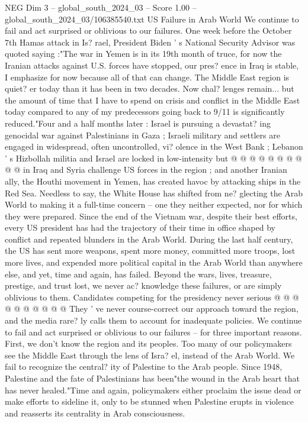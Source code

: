 \begin{textsample}{NEG Dim 3 – global\_south\_2024\_03 – Score 1.00 – global\_south\_2024\_03/106385540.txt}  \label{ex:f3_neg_039}
US Failure in Arab World We continue to fail and act surprised or oblivious to our failures.
One week before the October 7th Hamas attack in Is? rael, President Biden ' s National Security Advisor was quoted saying :"The war in Yemen is in its 19th month of truce, for now the Iranian attacks against U.S. forces have stopped, our pres? ence in Iraq is stable, I emphasize for now because all of that can change.
The Middle East region is quiet? er today than it has been in two decades.
Now chal? lenges remain... but the amount of time that I have to spend on crisis and conflict in the Middle East today compared to any of my predecessors going back to 9/11 is significantly reduced."Four and a half months later : Israel is pursuing a devastat? ing genocidal war against Palestinians in Gaza ; Israeli military and settlers are engaged in widespread, often uncontrolled, vi? olence in the West Bank ; Lebanon ' s Hizbollah militia and Israel are locked in low-intensity but @ @ @ @ @ @ @ @ @ @ in Iraq and Syria challenge US forces in the region ; and another Iranian ally, the Houthi movement in Yemen, has created havoc by attacking ships in the Red Sea.
Needless to say, the White House has shifted from ne? glecting the Arab World to making it a full-time concern -- one they neither expected, nor for which they were prepared.
Since the end of the Vietnam war, despite their best efforts, every US president has had the trajectory of their time in office shaped by conflict and repeated blunders in the Arab World.
During the last half century, the US has sent more weapons, spent more money, committed more troops, lost more lives, and expended more political capital in the Arab World than anywhere else, and yet, time and again, has failed.
Beyond the wars, lives, treasure, prestige, and trust lost, we never ac? knowledge these failures, or are simply oblivious to them.
Candidates competing for the presidency never serious @ @ @ @ @ @ @ @ @ @ They ' ve never course-correct our approach toward the region, and the media rare? ly calls them to account for inadequate policies.
We continue to fail and act surprised or oblivious to our failures -- for three important reasons.
First, we don't know the region and its peoples.
Too many of our policymakers see the Middle East through the lens of Isra? el, instead of the Arab World.
We fail to recognize the central? ity of Palestine to the Arab people.
Since 1948, Palestine and the fate of Palestinians has been"the wound in the Arab heart that has never healed."Time and again, policymakers either proclaim the issue dead or make efforts to sideline it, only to be stunned when Palestine erupts in violence and reasserts its centrality in Arab consciousness.

\end{textsample}
